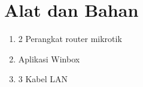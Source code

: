 \section*{Alat dan Bahan}
\indent
\begin{enumerate}
    \item 2 Perangkat router mikrotik
    \item Aplikasi Winbox
    \item 3 Kabel LAN
\end{enumerate}